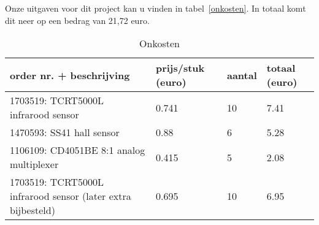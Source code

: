 Onze uitgaven voor dit project kan u vinden in tabel~\vref{onkosten}. In totaal komt dit neer op een bedrag van 21,72 euro.  

\begin{table}[H]
\centering
\caption{Onkosten}
\label{onkosten}
\begin{tabular}{llll}
order nr. + beschrijving                                                           & prijs/stuk (euro)          & aantal                  & totaal (euro)             \\ \hline
\multicolumn{1}{|l|}{1703519: TCRT5000L infrarood sensor}                          & \multicolumn{1}{l|}{0.741} & \multicolumn{1}{l|}{10} & \multicolumn{1}{l|}{7.41} \\ \hline
\multicolumn{1}{|l|}{1470593: SS41 hall sensor}                                    & \multicolumn{1}{l|}{0.88}  & \multicolumn{1}{l|}{6}  & \multicolumn{1}{l|}{5.28} \\ \hline
\multicolumn{1}{|l|}{1106109: CD4051BE 8:1 analog multiplexer}                     & \multicolumn{1}{l|}{0.415} & \multicolumn{1}{l|}{5}  & \multicolumn{1}{l|}{2.08} \\ \hline
\multicolumn{1}{|l|}{1703519: TCRT5000L infrarood sensor (later extra bijbesteld)} & \multicolumn{1}{l|}{0.695} & \multicolumn{1}{l|}{10} & \multicolumn{1}{l|}{6.95} \\ \hline
\end{tabular}
\end{table}